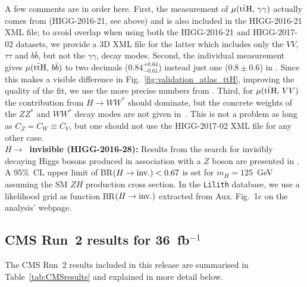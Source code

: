 A few comments are in order here. First, the measurement of $\mu({\rm t\bar tH},\,\gamma\gamma)$ actually comes from 
\cite{Aaboud:2018xdt} (HIGG-2016-21, see above) and is also included in the HIGG-2016-21 XML file; 
to avoid overlap when using both the HIGG-2016-21 and HIGG-2017-02 datasets, we provide a 3D XML file for the latter 
which includes only the $VV$, $\tau\tau$ and $b\bar b$, but not the $\gamma\gamma$, decay modes. 
Second, the individual measurement \cite{Aaboud:2017rss} gives $\mu({\rm t\bar tH},\,b\bar b)$ to two decimals 
($0.84^{+0.64}_{-0.61}$) instead just one ($0.8\pm 0.6$) in \cite{Aaboud:2017jvq}. Since this makes a visible difference 
in Fig.~\ref{fig:validation_atlas_ttH}, improving the quality of the fit, we use the more precise numbers from  \cite{Aaboud:2017rss}. 
Third, for $\mu({\rm t\bar tH},\,VV)$ the contribution from $H\to WW^*$ should dominate, but the concrete weights of the 
$ZZ^*$ and $WW^*$ decay modes are not given in~\cite{Aaboud:2017jvq}. This is not a problem as long as $C_Z=C_W\equiv C_V$, but one should 
not use the HIGG-2017-02 XML file for any other case.\\

{\bf\boldmath $H\to$~invisible (HIGG-2016-28):} 
Results from the search for invisibly decaying Higgs bosons produced in association with a $Z$ boson are presented in \cite{Aaboud:2017bja}. 
A 95\%~CL upper limit of BR$(H\to {\rm inv.})<0.67$ is set for $m_H= 125$~GeV assuming the SM $ZH$ production cross section. 
In the {\tt Lilith} database, 
we use a likelihood grid as function BR$(H\to {\rm inv.})$ extracted from Aux. Fig.~1c on the analysis' webpage. \\



\subsection{CMS Run~2 results for 36~fb$^{-1}$}

The CMS Run~2 results included in this release are summarised in Table~\ref{tab:CMSresults} and explained in more detail below.

